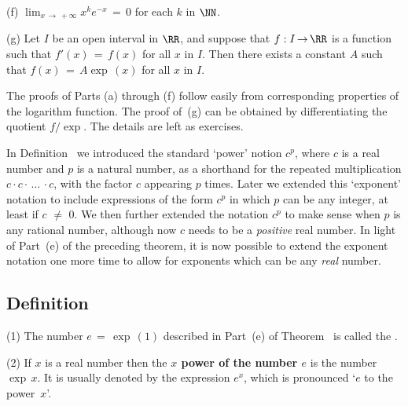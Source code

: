 \V

        (f) $\lim_{x \,{\rightarrow}\, +{\infty}}x^{k}e^{-x} \,=\, 0$ for each $k$ in ${\NN}$.


\V

        (g) Let $I$ be an open interval in ${\RR}$, and suppose that $f:I \,{\rightarrow}\, {\RR}$ is a function such that $f'(x) \,=\, f(x)$ for all $x$ in $I$.
    Then there exists a constant $A$ such that $f(x) \,=\, A{\exp}\,(x)$ for all $x$ in $I$.

\V

        The proofs of Parts (a) through (f) follow easily from corresponding properties of the logarithm function.
    The proof of~(g) can be obtained by differentiating the quotient $f/{\exp}$. The details are left as exercises. \Q

\VV

        In Definition~ we introduced the standard `power' notion $c^{p}$, where $c$ is a real number and $p$ is a natural number,
    as a shorthand for the repeated multiplication $c{\cdot}c{\cdot}\,{\ldots}\,{\cdot}c$, with the factor $c$ appearing $p$ times.
    Later we extended this `exponent' notation to include expressions of the form $c^{p}$ in which $p$ can be any integer, at least if $c \,\,{\neq}\,\, 0$.
    We then further extended the notation $c^{p}$ to make sense when $p$ is any rational number, although now $c$ needs to be a {\em positive} real number.
    In light of Part~(e) of the preceding theorem, it is now possible to extend the exponent notation
    one more time to allow for exponents which can be any {\em real} number.

\V

             \subsection{\small{\bf Definition}}
            \label{DefE45.127F}

\V

\hspace*{\parindent}(1) The number $e \,=\, {\exp}\,(1)$ described in Part~(e) of Theorem~ is called the {\bf {}}.

\V

        (2) If $x$ is a real number then the {\bf $x$ power of the number $e$} is the number ${\exp}\,x$.
    It is usually denoted by the expression $e^{x}$, which is pronounced `$e$ to the power~$x$'.

